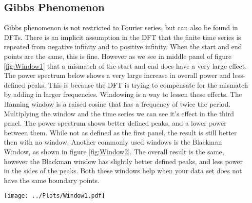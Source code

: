 \documentclass[twocolumn]{myarticle}
\begin{document}

\subsection{Gibbs Phenomenon}
\label{sec:gibbs_phenomenon}

Gibbs phenomenon is not restricted to Fourier series, but can also be found in DFTs. 
There is an implicit assumption in the DFT that the finite time series is repeated from negative infinity and to positive infinity. 
When the start and end points are the same, this is fine. 
However as we see in middle panel of figure \ref{fig:Window1} that a mismatch of the start and end does have a very large effect. 
The power spectrum below shows a very large increase in overall power and less-defined peaks. 
This is because the DFT is trying to compensate for the mismatch by adding in larger frequencies. 
Windowing is a way to lessen these effects. 
The Hanning window is a raised cosine that has a frequency of twice the period. 
Multiplying the window and the time series we can see it's effect in the third panel. 
The power spectrum shows better defined peaks, and a lower power between them. 
While not as defined as the first panel, the result is still better then with no window. 
Another commonly used windows is the Blackman Window, as shown in figure \ref{fig:Window2}. 
The overall result is the same, however the Blackman window has slightly better defined peaks, and less power in the sides of the peaks. 
Both these windows help when your data set does not have the same boundary points.

\begin{figure*}[htpb]
    \centering
    \texttt{[image: ../Plots/Window1.pdf]}
    \caption{%
        Looking at the Hanning window. The top resents the time series of a plain sine wave, a sine wave that is not periodic in the interval, and the effect of the Hanning window on the non-periodic wave. The bottom displays the corresponding power spectra.
    }
    \label{fig:Window1}
\end{figure*}
\end{document}
